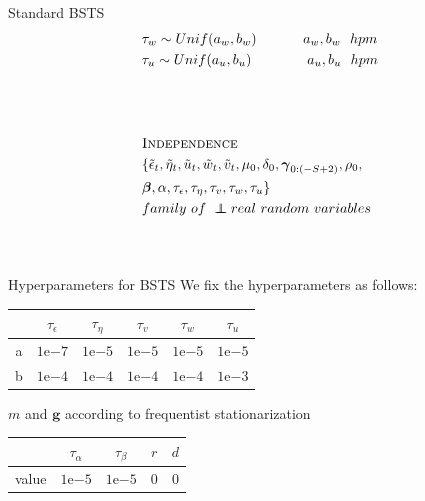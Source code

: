 \documentclass{beamer}
\newcommand\independent{\protect\mathpalette{\protect\independenT}{\perp}}
\def\independenT#1#2{\mathrel{\rlap{$#1#2$}\mkern2mu{#1#2}}}
\begin{document}
\begin{frame}{Standard BSTS}
\begin{equation*}
\begin{aligned}[c]
&\tau_w\sim Unif(a_w, b_w)\quad\quad\quad\ a_w, b_w\ \ hpm\\
&\tau_u \sim Unif(a_u, b_u)\quad\quad\quad\quad a_u, b_u\ \ hpm\\
&\\
&\\
&\\
&\textsc{Independence}\\
&\{\tilde{\epsilon}_t, \tilde{\eta}_t, \tilde{u}_t, \tilde{w}_t, \tilde{v}_t, \mu_0, \delta_0, \boldsymbol{\gamma}_{0:(-S+2)}, \rho_0,\\ &\boldsymbol{\beta}, \alpha, \tau_\epsilon, \tau_\eta, \tau_v, \tau_w, \tau_u\}\\ &family\ of\ \independent real\ random\ variables\\
&\\
&\\
\end{aligned}
\end{equation*}
\end{frame}

\begin{frame}{Hyperparameters for  BSTS}
We fix the \alert{hyperparameters} as follows:
\begin{table}[!htb]
	\centering
		\begin{tabular}{|c|c|c|c|c|c|}
			\hline
			& $ \tau_\epsilon $ & $ \tau_\eta $ &$  \tau_v $ & $ \tau_w $ & $ \tau_ u $\\
			\hline
			a &$  1\mathrm{e}{-7} $ & $  1\mathrm{e}{-5} $ &$  1\mathrm{e}{-5} $&$  1\mathrm{e}{-5} $&$  1\mathrm{e}{-5} $\\
			\hline
			b &$  1\mathrm{e}{-4} $ & $  1\mathrm{e}{-4} $ &$  1\mathrm{e}{-4} $&$  1\mathrm{e}{-4} $&$  1\mathrm{e}{-3} $\\
			\hline
		\end{tabular} 
\end{table}

$ m $ and $ \mathbf{g} $ according to \alert{frequentist stationarization}

\begin{table}[!htb]
	\centering
		\begin{tabular}{|c|c|c|c|c|}
			\hline
			& $ \tau_\alpha $ & $ \tau_\beta $ & $ r $ & $ d $\\
			\hline
			value &$  1\mathrm{e}{-5} $ & $  1\mathrm{e}{-5} $& 0 & 0\\
			\hline
		\end{tabular} 
\end{table}
\end{frame}
\end{document}
